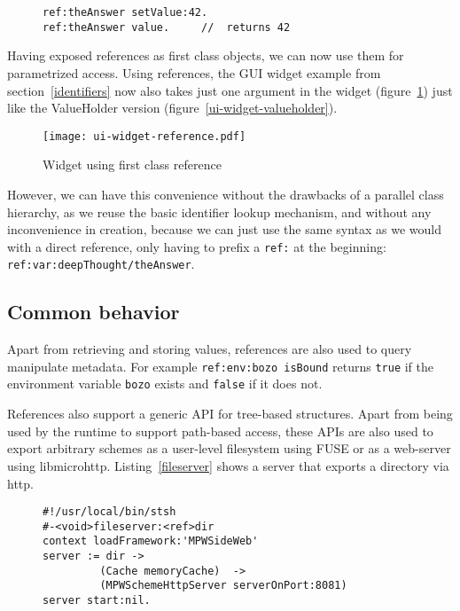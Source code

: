 \documentclass[preprint,authoryear]{llncs}
\begin{document}
\begin{figure}[htbp]
\begin{lstlisting}[style=numbers,label=ref-binding,caption=Accessing a variable via its reference.]
ref:theAnswer setValue:42.  
ref:theAnswer value.     //  returns 42
\end{lstlisting}
\end{figure}

Having exposed references as first class objects, we can now use them for parametrized 
access.   Using references, the GUI widget example from section~\ref{identifiers} now
also takes just one argument in the widget (figure~\ref{ui-widget-reference}) just like
the ValueHolder version (figure~\ref{ui-widget-valueholder}).

\begin{figure}[htbp]
\begin{center}
\texttt{[image: ui-widget-reference.pdf]}
\caption{Widget using first class reference}
\label{ui-widget-reference}
\end{center}
\end{figure}

However, we can have this convenience without the drawbacks of a parallel class
hierarchy, as we reuse the basic identifier lookup mechanism, and without any
inconvenience in creation, because we can just use the same syntax as we would
with a direct reference, only having to prefix a {\tt ref:} at the beginning:  {\tt ref:var:deepThought/theAnswer}.


\subsection{Common behavior}
\label{common-reference-behavior}
Apart from retrieving and storing values, references are also used to query manipulate
metadata.  For example {\tt ref:env:bozo isBound} returns {\tt true} if the environment
variable {\tt bozo} exists and {\tt false} if it does not.

References also support a generic API for tree-based structures.   Apart from being used
by the runtime to support path-based access, these APIs are also used to export arbitrary
schemes as a user-level filesystem using FUSE or as a web-server using libmicrohttp.
Listing~\ref{fileserver} shows a server that exports a directory via http.

\begin{figure}[htbp]
\begin{lstlisting}[style=L,label=fileserver,caption=Exporting a directory via http.]
#!/usr/local/bin/stsh
#-<void>fileserver:<ref>dir
context loadFramework:'MPWSideWeb'
server := dir -> 
         (Cache memoryCache)  -> 
         (MPWSchemeHttpServer serverOnPort:8081)
server start:nil.
\end{lstlisting}
\end{figure}
\end{document}
